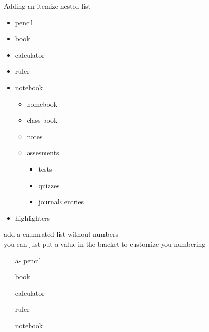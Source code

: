 \documentclass[12pt]{article}
\begin{document}
\vspace*{1cm}

Adding an itemize nested list
\begin{itemize}
    \item pencil
    \item book
    \item calculator
    \item ruler
    \item notebook
          \begin{itemize}
              \item homebook
              \item class book
              \item notes
              \item assesments
                    \begin{itemize}
                        \item tests
                        \item quizzes
                        \item journals entries
                    \end{itemize}
          \end{itemize}
    \item highlighters
\end{itemize}

\pagebreak

add a enumrated list without numbers \\ you can just put a value in the bracket
to customize you numbering
\begin{enumerate}
    \item[a-] pencil
    \item[] book
    \item[] calculator
    \item[] ruler
    \item[] notebook
\end{enumerate}
\end{document}

